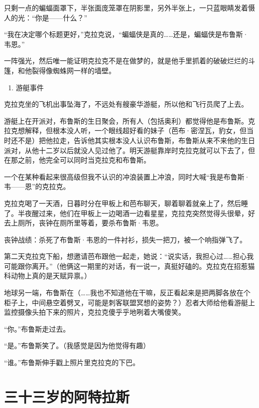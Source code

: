 \documentclass[../main]{subfiles}
\begin{document}
只剩一点的蝙蝠面罩下，半张面庞笼罩在阴影里，另外半张上，一只蓝眼睛发着慑人的光：“你是——什么？”

“我在决定哪个标题更好，”克拉克说，“蝙蝠侠是真的……还是，蝙蝠侠是布鲁斯·韦恩。”

一阵强光，然后唯一能证明克拉克不是在做梦的，就是他手里抓着的破破烂烂的斗篷，和他裂得像蜘蛛网一样的墙壁。

\begin{enumerate}
    \def\labelenumi{\arabic{enumi}.}
    \setcounter{enumi}{1}
    \item
          游艇事件
\end{enumerate}

克拉克坐的飞机出事坠海了，不远处有艘豪华游艇，所以他和飞行员爬了上去。

游艇上在开派对，布鲁斯的生日聚会，所有人（包括奥利）都觉得他是布鲁斯。克拉克想解释，但根本没人听，一个眼线超好看的妹子（芭布·密涅瓦，豹女，但当时还不是）把他拉走，告诉他其实根本没人认识布鲁斯，布鲁斯从来不来他的生日派对，从他十二岁以后就没人见过他了。明天游艇靠岸时克拉克就可以下去了，但在那之前，他完全可以同时当克拉克和布鲁斯。

一个在某种看起来很高级但我不认识的冲浪装置上冲浪，同时大喊“我是布鲁斯·韦——恩”的克拉克。

克拉克喝了一天酒，日暮时分在甲板上和芭布聊天，聊着聊着就亲上了，然后睡了。半夜醒过来，他们在甲板上一边喝酒一边看星星，克拉克突然觉得头很晕，好去上厕所，丧钟在厕所里等着，要杀布鲁斯·韦恩。

丧钟战绩：杀死了布鲁斯·韦恩的一件衬衫，损失一把刀，被一个响指弹飞了。

第二天克拉克下船，想邀请芭布跟他一起走，她说：“说实话，我担心过……担心我可能跟你离开。”（他俩这一期里的对话，有一说一，真挺好磕的。克拉克在招惹猫科动物上真的是天赋异禀。）

地球另一端，布鲁斯在（……我也不知道他在干嘛，反正看起来是把两脚各放在个柜子上，中间悬空着劈叉，可能是刺客联盟冥想的姿势？）忍者大师给他看游艇上监控摄像头拍下来的照片，克拉克傻乎乎地咧着大嘴傻笑。

“你。”布鲁斯走过去。

“是。”布鲁斯笑了。（我感觉是因为他觉得有趣）

“谁。”布鲁斯伸手戳上照片里克拉克的下巴。


\section{三十三岁的阿特拉斯}
\end{document}
